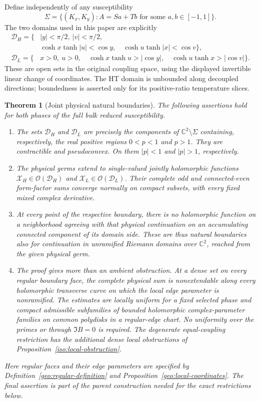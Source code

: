 \documentclass[11pt]{article}
\numberwithin{equation}{section}
\newtheorem{theorem}{Theorem}[section]
\theoremstyle{definition}
\newcommand{\C}{\mathbb C}
\renewcommand{\DH}{\mathcal D_H}
\newcommand{\DL}{\mathcal D_L}
\newcommand{\XH}{\mathcal X_H}
\newcommand{\XL}{\mathcal X_L}
\begin{document}
Define independently of any susceptibility
\[
 \Sigma=\{(K_x,K_y):A=Sa+Tb\text{ for some }a,b\in[-1,1]\}.
\]
The two domains used in this paper are explicitly
\begin{align}
 \DH=\bigl\{&|y|<\pi/2,\ |v|<\pi/2,\nonumber\\[-2pt]
       &\cosh x\tanh|u|<\cos y,\quad
        \cosh u\tanh|x|<\cos v\bigr\},\label{main:DH}\\
 \DL=\bigl\{&x>0,\ u>0,\quad
       \cosh x\tanh u>|\cos y|,\quad
       \cosh u\tanh x>|\cos v|\bigr\}.\label{main:DL}
\end{align}
These are open sets in the original coupling space, using the displayed
invertible linear change of coordinates. The HT domain is unbounded
along decoupled directions; boundedness is asserted only for its
positive-ratio temperature slices.

\begin{theorem}[Joint physical natural boundaries]\label{main:joint}
The following assertions hold for both phases of the full bulk reduced
susceptibility.
\begin{enumerate}
\item The sets \(\DH\) and \(\DL\) are precisely the components of
\(\C^2\setminus\Sigma\) containing, respectively, the real positive
regions \(0<p<1\) and \(p>1\). They are contractible and
pseudoconvex. On them \(|p|<1\) and \(|p|>1\), respectively.
\item The physical germs extend to single-valued jointly holomorphic
functions \(\XH\in\mathcal O(\DH)\) and
\(\XL\in\mathcal O(\DL)\). Their complete odd and connected-even
form-factor sums converge normally on compact subsets, with every
fixed mixed complex derivative.
\item At every point of the respective boundary, there is no
holomorphic function on a neighborhood agreeing with that physical
continuation on an accumulating connected component of its domain
side. These are thus natural boundaries also for continuation in
unramified Riemann domains over \(\C^2\), reached from the given
physical germ.
\item The proof gives more than an ambient obstruction. At a dense
set on every regular boundary face, the complete physical sum is
nonextendable along every holomorphic transverse curve on which the
local edge parameter is nonramified. The estimates are locally
uniform for a fixed selected phase and compact admissible subfamilies
of bounded holomorphic complex-parameter families on common polydisks
in a regular-edge chart. No uniformity over the primes or through
\(\Im B=0\) is required. The degenerate equal-coupling restriction has the additional
dense local obstructions of Proposition~\ref{iso:local-obstruction}.
\end{enumerate}
Here regular faces and their edge parameters are specified by
Definition~\ref{geo:regular-definition} and
Proposition~\ref{geo:local-coordinates}. The final assertion is part
of the parent construction needed for the exact restrictions below.
\end{theorem}
\end{document}
